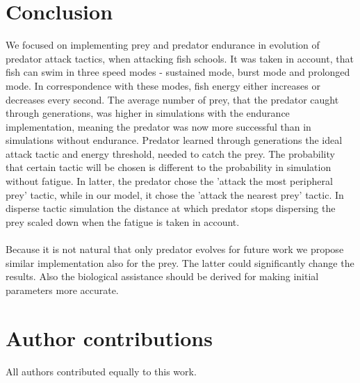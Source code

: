 \documentclass[internal]{FRIreport}
\begin{document}
%
%

%
\section{Conclusion}
We focused on implementing prey and predator endurance in evolution of predator attack tactics, when attacking fish schools. It was taken in account, that fish can swim in three speed modes - sustained mode, burst mode and prolonged mode. In correspondence with these modes, fish energy either increases or decreases every second. The average number of prey, that the predator caught through generations, was higher in simulations with the endurance implementation, meaning the predator was now more successful than in simulations without endurance. Predator learned through generations the ideal attack tactic and energy threshold, needed to catch the prey. The probability that certain tactic will be chosen is different to the probability in simulation without fatigue. In latter, the predator chose the 'attack the most peripheral prey' tactic, while in our model, it chose the 'attack the nearest prey' tactic. In disperse tactic simulation the distance at which predator stops dispersing the prey scaled down when the fatigue is taken in account. 
~\\\\
Because it is not natural that only predator evolves for future work we propose similar implementation also for the prey. The latter could significantly change the results. Also the biological assistance should be derived for making initial parameters more accurate. 
%

%
\section*{Author contributions}
%
All authors contributed equally to this work.
%
\pagebreak
\References
%


\end{document}
